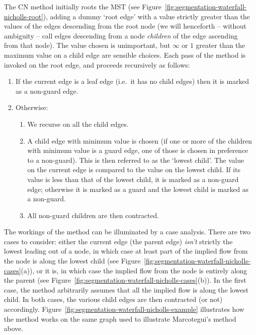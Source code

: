 \documentclass[preprint,a4paper]{elsarticle}
\begin{document}
The CN method initially roots the MST (see Figure~\ref{fig:segmentation-waterfall-nicholls-root}), adding a dummy `root edge' with a value strictly greater than the values of the edges descending from the root node (we will henceforth -- without ambiguity -- call edges descending from a node \emph{children} of the edge ascending from that node). The value chosen is unimportant, but $\infty$ or $1$ greater than the maximum value on a child edge are sensible choices. Each pass of the method is invoked on the root edge, and proceeds recursively as follows:
%
\begin{enumerate}

\item If the current edge is a leaf edge (i.e.~it has no child edges) then it is marked as a non-guard edge.

\item Otherwise:

\begin{enumerate}

\item We recurse on all the child edges.

\item A child edge with minimum value is chosen (if one or more of the children with minimum value is a guard edge, one of those is chosen in preference to a non-guard). This is then referred to as the `lowest child'. The value on the current edge is compared to the value on the lowest child. If its value is less than that of the lowest child, it is marked as a non-guard edge; otherwise it is marked as a guard and the lowest child is marked as a non-guard.

\item All non-guard children are then contracted.

\end{enumerate}

\end{enumerate}

\noindent The workings of the method can be illuminated by a case analysis. There are two cases to consider: either the current edge (the parent edge) \emph{isn't} strictly the lowest leading out of a node, in which case at least part of the implied flow from the node is along the lowest child (see Figure~\ref{fig:segmentation-waterfall-nicholls-cases}(a)), or it is, in which case the implied flow from the node is entirely along the parent (see Figure~\ref{fig:segmentation-waterfall-nicholls-cases}(b)). In the first case, the method arbitrarily assumes that all the implied flow is along the lowest child. In both cases, the various child edges are then contracted (or not) accordingly. Figure~\ref{fig:segmentation-waterfall-nicholls-example} illustrates how the method works on the same graph used to illustrate Marcotegui's method above.
\end{document}
